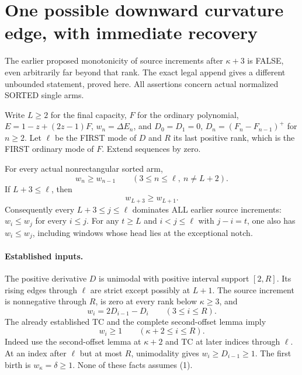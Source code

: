 \section{One possible downward curvature edge, with immediate recovery}
The earlier proposed monotonicity of source increments after
$\kappa+3$ is FALSE, even arbitrarily far beyond that rank.
The exact legal append gives a different unbounded statement, proved here.
All assertions concern actual normalized SORTED single arms.

Write $L\ge2$ for the final capacity, $F$ for the ordinary polynomial,
$E=1-z+(2z-1)F$, $w_n=\Delta E_n$, and
$D_0=D_1=0$, $D_n=(F_n-F_{n-1})^+$ for $n\ge2$.
Let $\ell$ be the FIRST mode of $D$ and $R$ its last positive rank,
which is the FIRST ordinary mode of $F$. Extend sequences by zero.

\begin{theorem}
For every actual nonrectangular sorted arm,
\[
 w_n\ge w_{n-1}\qquad(3\le n\le\ell,\ n\ne L+2).        \tag{1}
\]
If $L+3\le\ell$, then
\[
                         w_{L+3}\ge w_{L+1}.            \tag{2}
\]
Consequently every $L+3\le j\le\ell$ dominates ALL earlier
source increments: $w_i\le w_j$ for every $i\le j$.
For any $t\ge L$ and $i<j\le\ell$ with $j-i=t$, one also has
$w_i\le w_j$, including windows whose head lies at the exceptional notch.
\end{theorem}

\paragraph{Established inputs.}
The positive derivative $D$ is unimodal with positive interval
support $[2,R]$. Its rising edges through $\ell$ are strict except
possibly at $L+1$. The source increment is nonnegative through $R$,
is zero at every rank below $\kappa\ge3$, and
\[
             w_i=2D_{i-1}-D_i\qquad(3\le i\le R).      \tag{3}
\]
The already established TC and the complete second-offset lemma imply
\[
                      w_i\ge1\qquad(\kappa+2\le i\le R). \tag{4}
\]
Indeed use the second-offset lemma at $\kappa+2$ and TC at later
indices through $\ell$. At an index after $\ell$ but at most $R$,
unimodality gives $w_i\ge D_{i-1}\ge1$. The first birth is
$w_\kappa=\delta\ge1$. None of these facts assumes (1).

